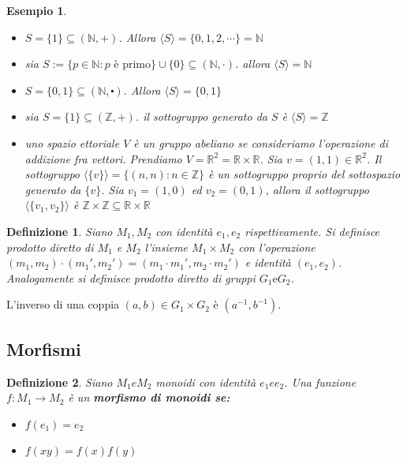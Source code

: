 \documentclass[a4paper,12pt]{article}
\theoremstyle{def}
\newtheorem*{definition}{Definizione}
\theoremstyle{prop}
\theoremstyle{esempio}
\newtheorem*{example}{Esempio}
\theoremstyle{dimostrazione}
\theoremstyle{teo}
\theoremstyle{osservazione}
\begin{document}
\begin{example}
	\
	\begin{itemize}
		\item \(S = \{1\} \subseteq  (\mathbb{N}, +)\). Allora \(\langle S \rangle = \{0,1,2,\cdots\} = \mathbb{N}\)
		\item sia \(S:= \{p \in \mathbb{N} : p \text{ è primo}\} \cup \{0\} \subseteq (\mathbb{N}, \cdot)\).
		      allora \(\langle S \rangle = \mathbb{N}\)
		\item \(S = \{0,1\} \subseteq (\mathbb{N} , \centerdot)\). Allora \(\langle S \rangle = \{0,1\}\)
		\item sia \(S = \{1\} \subseteq  (\mathbb{Z}, +)\). il sottogruppo generato da \(S\) è \(\langle S \rangle
		      = \mathbb{Z}\)
		\item uno spazio ettoriale \(V\) è un gruppo abeliano se consideriamo l'operazione di addizione fra vettori.
		      Prendiamo \(V=\mathbb{R}^2 = \mathbb{R} \times \mathbb{R}\). Sia \(v = (1,1) \in \mathbb{R}^2\).
		      Il sottogruppo \(\langle \{v\} \rangle = \{(n,n): n \in \mathbb{Z}\}\) è un sottogruppo proprio del
		      sottospazio generato da \(\{v\}\). Sia \(v_1 = (1,0)\) ed \(v_2 = (0,1)\), allora il sottogruppo
		      \(\langle \{v_1,v_2\} \rangle\) è \(\mathbb{Z} \times \mathbb{Z} \subseteq  \mathbb{R} \times \mathbb{R}\)
	\end{itemize}
\end{example}


\begin{definition}
	Siano \(M_1 , M_2\) con identità \(e_1 , e_2\) rispettivamente. Si definisce prodotto diretto di \(M_1\)
	e \(M_2\) l'insieme \(M_1 \times M_2\) con l'operazione \((m_1,m_2) \cdot (m_1',m_2') = (m_1 \cdot m_1',
	m_2 \cdot m_2')\) e identità \((e_1,e_2)\). Analogamente si definisce prodotto diretto di
	gruppi \(G_1 \text{e} G_2\).
\end{definition}

L'inverso di una coppia \((a,b) \in G_1 \times G_2\) è \((a^{-1},b^{-1})\).

\subsection{Morfismi}

\begin{definition}
	Siano \(M_1 e M_2\) monoidi con identità \(e_1 e e_2\). Una funzione \(f : M_1 \rightarrow M_2\) è un
	\textbf{morfismo di monoidi se:}
	\
	\begin{itemize}
		\item \(f(e_1) = e_2\)
		\item \(f(xy) = f(x)f(y)\)
	\end{itemize}
\end{definition}
\end{document}
